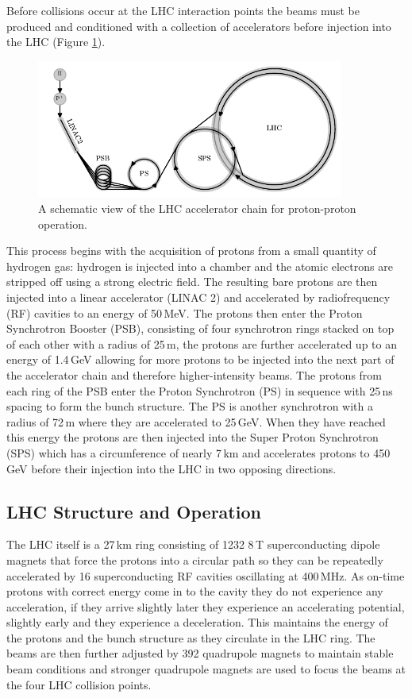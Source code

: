 Before collisions occur at the LHC interaction points the beams must be produced and conditioned with a collection of accelerators \cite{CERN_accelerator_complex} before injection into the LHC (Figure \ref{fig:apparatus:lhc_chain}).
\begin{figure}[h!]
    \centering
    \includegraphics[width=0.9\textwidth]{figures/apparatus/accel_chain.pdf}
    \caption{A schematic view of the LHC accelerator chain for proton-proton operation.}
    \label{fig:apparatus:lhc_chain}
\end{figure}
This process begins with the acquisition of protons from a small quantity of hydrogen gas: hydrogen is injected into a chamber and the atomic electrons are stripped off using a strong electric field. The resulting bare protons are then injected into a linear accelerator (LINAC 2) and accelerated by radiofrequency (RF) cavities to an energy of 50\,MeV. The protons then enter the Proton Synchrotron Booster (PSB), consisting of four synchrotron rings stacked on top of each other with a radius of 25\,m, the protons are further accelerated up to an energy of 1.4\,GeV allowing for more protons to be injected into the next part of the accelerator chain and therefore higher-intensity beams.
The protons from each ring of the PSB enter the Proton Synchrotron (PS) in sequence with 25\,ns spacing to form the bunch structure. The PS is another synchrotron with a radius of 72\,m where they are accelerated to 25\,GeV. 
When they have reached this energy the protons are then injected into the Super Proton Synchrotron (SPS) which has a circumference of nearly 7\,km and accelerates protons to 450\,GeV before their injection into the LHC in two opposing directions. 


\subsection{LHC Structure and Operation}
The LHC itself is a 27\,km ring consisting of 1232 8\,T superconducting dipole magnets that force the protons into a circular path so they can be repeatedly accelerated by 16 superconducting RF cavities oscillating at 400\,MHz. As on-time protons with correct energy come in to the cavity they do not experience any acceleration, if they arrive slightly later they experience an accelerating potential, slightly early and they experience a deceleration. This maintains the energy of the protons and the bunch structure as they circulate in the LHC ring. The beams are then further adjusted by 392 quadrupole magnets to maintain stable beam conditions and stronger quadrupole magnets are used to focus the beams at the four LHC collision points.

